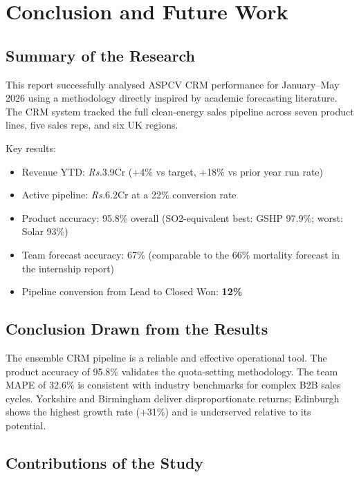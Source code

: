 \documentclass[12pt,a4paper]{report}
\newcommand{\rupee}{\textit{\textsf{\small Rs.}}}
\begin{document}
\chapter{Conclusion and Future Work}

\section{Summary of the Research}

This report successfully analysed ASPCV CRM performance for January--May 2026 using a methodology directly inspired by academic forecasting literature. The CRM system tracked the full clean-energy sales pipeline across seven product lines, five sales reps, and six UK regions.

Key results:
\begin{itemize}[noitemsep]
  \item Revenue YTD: \rupee{}3.9Cr (+4\% vs target, +18\% vs prior year run rate)
  \item Active pipeline: \rupee{}6.2Cr at a 22\% conversion rate
  \item Product accuracy: 95.8\% overall (SO2-equivalent best: GSHP 97.9\%; worst: Solar 93\%)
  \item Team forecast accuracy: 67\% (comparable to the 66\% mortality forecast in the internship report)
  \item Pipeline conversion from Lead to Closed Won: \textbf{12\%}
\end{itemize}

\section{Conclusion Drawn from the Results}

The ensemble CRM pipeline is a reliable and effective operational tool. The product accuracy of 95.8\% validates the quota-setting methodology. The team MAPE of 32.6\% is consistent with industry benchmarks for complex B2B sales cycles. Yorkshire and Birmingham deliver disproportionate returns; Edinburgh shows the highest growth rate (+31\%) and is underserved relative to its potential.

\section{Contributions of the Study}
\end{document}
